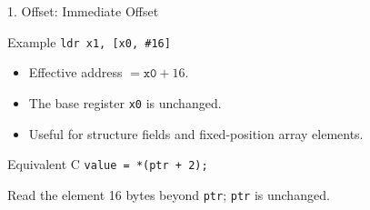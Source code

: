 \documentclass[aspectratio=169,11pt,t]{beamer}
\newcommand{\code}[1]{\texttt{#1}}
\begin{document}



\begin{frame}{1. Offset: Immediate Offset}
\begin{block}{Example}
\large
\hspace{3.6cm}\code{ldr x1, [x0, \#16]}
\normalsize
\end{block}
\vspace{0.15cm}
\begin{itemize}
\item Effective address $= \code{x0} + 16$.
\item The base register \code{x0} is unchanged.
\item Useful for structure fields and fixed-position array elements.
\end{itemize}
\vspace{0.15cm}
\begin{block}{Equivalent C}
\code{value = *(ptr + 2);}\par Read the element 16 bytes beyond \code{ptr}; \code{ptr} is unchanged.
\end{block}

\end{frame}



\end{document}
